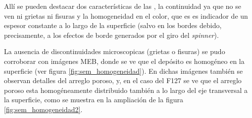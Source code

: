		Allí se pueden destacar dos características de las \pdm, la continuidad ya que no se ven ni grietas ni fisuras y la homogeneidad en el color, que es es indicador de un espesor constante a lo largo de la superficie (salvo en los bordes debido, precisamente, a los efectos de borde generados por el giro del \textit{spinner})\cite{Franssila2004,Jaeger2001}.

		La ausencia de discontinuidades microscopicas (grietas o fisuras) se pudo corroborar con imágenes MEB, donde se ve que el depósito es homogéneo en la superficie (ver figura \ref{fig:sem_homogeneidad}). En dichas imágenes también se observan detalles del arreglo poroso, y, en el caso del F127 se ve que el arreglo poroso esta homogéneamente distribuido también a lo largo del eje transversal a la superficie, como se muestra en la ampliación de la figura \ref{fig:sem_homogeneidad2}.

